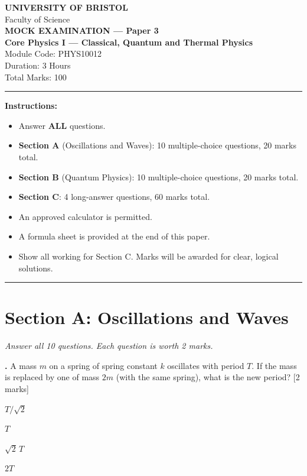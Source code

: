 \documentclass[12pt,a4paper]{article}
\newcounter{mcqcounter}
\newcommand{\mcq}[1]{%
  \stepcounter{mcqcounter}%
  \vspace{0.3cm}%
  \noindent\textbf{\themcqcounter.} #1 \hfill [2 marks]%
  \vspace{0.1cm}%
}
\begin{document}
\begin{center}
{\Large\textbf{UNIVERSITY OF BRISTOL}}\\[0.3cm]
{\large Faculty of Science}\\[0.5cm]
{\Large\textbf{MOCK EXAMINATION --- Paper 3}}\\[0.3cm]
{\large\textbf{Core Physics I --- Classical, Quantum and Thermal Physics}}\\[0.2cm]
{\large Module Code: PHYS10012}\\[0.5cm]
{\large Duration: 3 Hours}\\[0.3cm]
{\large Total Marks: 100}\\[0.5cm]
\end{center}

\noindent\rule{\textwidth}{0.4pt}

\vspace{0.3cm}
\noindent\textbf{Instructions:}
\begin{itemize}[itemsep=0.1cm]
\item Answer \textbf{ALL} questions.
\item \textbf{Section A} (Oscillations and Waves): 10 multiple-choice questions, 20 marks total.
\item \textbf{Section B} (Quantum Physics): 10 multiple-choice questions, 20 marks total.
\item \textbf{Section C}: 4 long-answer questions, 60 marks total.
\item An approved calculator is permitted.
\item A formula sheet is provided at the end of this paper.
\item Show all working for Section C. Marks will be awarded for clear, logical solutions.
\end{itemize}

\noindent\rule{\textwidth}{0.4pt}
\newpage

\section*{Section A: Oscillations and Waves}
\noindent\textit{Answer all 10 questions. Each question is worth 2 marks.}\\[0.3cm]

\setcounter{mcqcounter}{0}

\mcq{A mass $m$ on a spring of spring constant $k$ oscillates with period $T$. If the mass is replaced by one of mass $2m$ (with the same spring), what is the new period?}
\begin{choices}
\item $T/\sqrt{2}$
\item $T$
\item $\sqrt{2}\,T$
\item $2T$
\end{choices}
\end{document}

